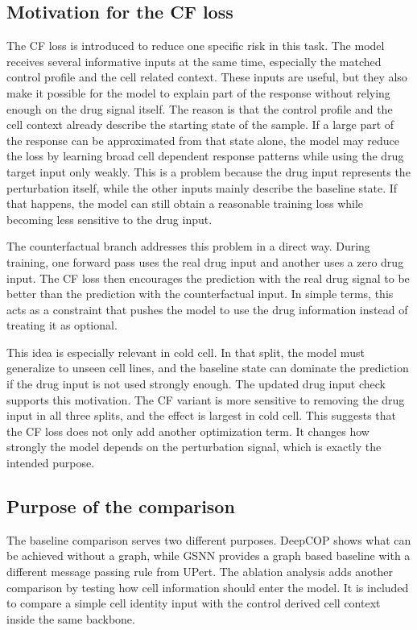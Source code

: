\subsection{Motivation for the CF loss}
\noindent The CF loss is introduced to reduce one specific risk in this task. The model receives several informative inputs at the same time, especially the matched control profile and the cell related context. These inputs are useful, but they also make it possible for the model to explain part of the response without relying enough on the drug signal itself. The reason is that the control profile and the cell context already describe the starting state of the sample. If a large part of the response can be approximated from that state alone, the model may reduce the loss by learning broad cell dependent response patterns while using the drug target input only weakly. This is a problem because the drug input represents the perturbation itself, while the other inputs mainly describe the baseline state. If that happens, the model can still obtain a reasonable training loss while becoming less sensitive to the drug input.

\noindent The counterfactual branch addresses this problem in a direct way. During training, one forward pass uses the real drug input and another uses a zero drug input. The CF loss then encourages the prediction with the real drug signal to be better than the prediction with the counterfactual input. In simple terms, this acts as a constraint that pushes the model to use the drug information instead of treating it as optional.

\noindent This idea is especially relevant in cold cell. In that split, the model must generalize to unseen cell lines, and the baseline state can dominate the prediction if the drug input is not used strongly enough. The updated drug input check supports this motivation. The CF variant is more sensitive to removing the drug input in all three splits, and the effect is largest in cold cell. This suggests that the CF loss does not only add another optimization term. It changes how strongly the model depends on the perturbation signal, which is exactly the intended purpose.

\subsection{Purpose of the comparison}
\noindent The baseline comparison serves two different purposes. DeepCOP shows what can be achieved without a graph, while GSNN provides a graph based baseline with a different message passing rule from UPert. The ablation analysis adds another comparison by testing how cell information should enter the model. It is included to compare a simple cell identity input with the control derived cell context inside the same backbone.

